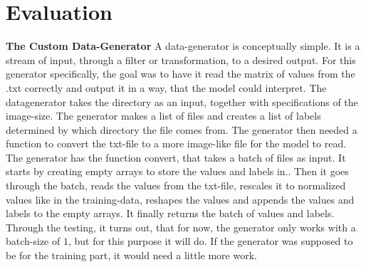 \section{Evaluation}

\textbf{The Custom Data-Generator}
\newline
A data-generator is conceptually simple. It is a stream of input, through a filter or transformation, to a desired output.
For this generator specifically, the goal was to have it read the matrix of values from the .txt correctly and output it in a way, that the model could interpret. The datagenerator takes the directory as an input, together with specifications of the image-size. The generator makes a list of files and creates a list of labels determined by which directory the file comes from. The generator then needed a function to convert the txt-file to a more image-like file for the model to read. The generator has the function convert,  that takes a batch of files as input. It starts by creating empty arrays to store the values and labels in..  Then it goes through the batch, reads the values from the txt-file, rescales it to normalized values like in the training-data, reshapes the values and appends the values and labels to the empty arrays. It finally returns the batch of values and labels. Through the testing, it turns out, that for now, the generator only works with a batch-size of $1$, but for this purpose it will do. If the generator was supposed to be for the training part, it would need a little more work.  